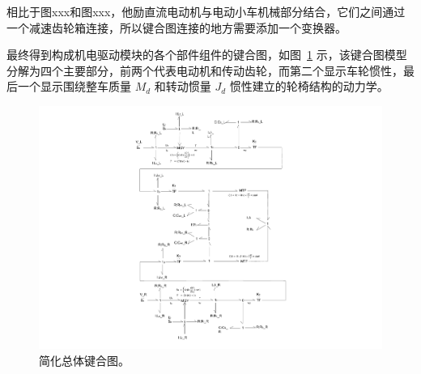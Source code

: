 相比于图xxx和图xxx，他励直流电动机与电动小车机械部分结合，它们之间通过一个减速齿轮箱连接，所以键合图连接的地方需要添加一个变换器。

最终得到构成机电驱动模块的各个部件组件的键合图，如图~\ref{fig:part2_bond} 示，该键合图模型分解为四个主要部分，前两个代表电动机和传动齿轮，而第二个显示车轮惯性，最后一个显示围绕整车质量 $M_d$ 和转动惯量 $J_d$ 惯性建立的轮椅结构的动力学。

\begin{figure}[!h]
	\centering
	\includegraphics[width=1.05\textwidth]{fig/part2_bond.pdf}
	\caption{简化总体键合图。}\label{fig:part2_bond}
\end{figure}

